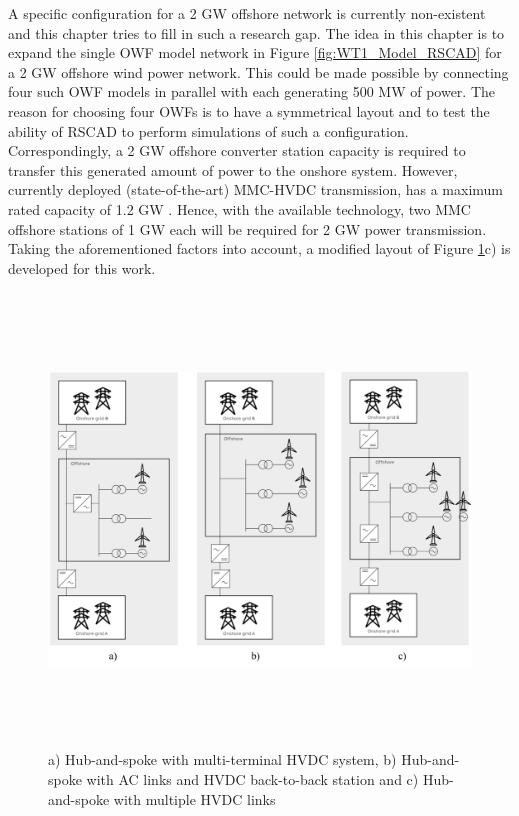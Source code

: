 A specific configuration for a 2 GW offshore network is currently non-existent and this chapter tries to fill in such a research gap. The idea in this chapter is to expand the single \gls{OWF} model network in Figure \ref{fig:WT1_Model_RSCAD} for a 2 GW offshore wind power network. This could be made possible by connecting four such \gls{OWF} models in parallel with each generating 500 MW of power. The reason for choosing four \gls{OWF}s is to have a symmetrical layout and to test the ability of RSCAD to perform simulations of such a configuration. Correspondingly, a 2 GW offshore converter station capacity is required to transfer this generated amount of power to the onshore system. However, currently deployed (state-of-the-art) \gls{MMC}-\gls{HVDC} transmission, has a maximum rated capacity of 1.2 GW \cite{peralta2012detailed}. Hence, with the available technology, two \gls{MMC} offshore stations of 1 GW each will be required for 2 GW power transmission. Taking the aforementioned factors into account, a modified layout of Figure \ref{fig:ABB_Hub_Spoke_3}c) is developed for this work. 

\begin{figure}[H]
\centering
    \includegraphics[height = 12cm,width = \textwidth]{Diagrams/Chapter_4/ABB_Hub_Spoke_3.png}
    \caption{a) Hub-and-spoke with multi-terminal HVDC system, b) Hub-and-spoke with AC links and HVDC back-to-back station and c) Hub-and-spoke with multiple HVDC links \cite{abb_hvdc_2018}}
    \label{fig:ABB_Hub_Spoke_3}
\end{figure}

